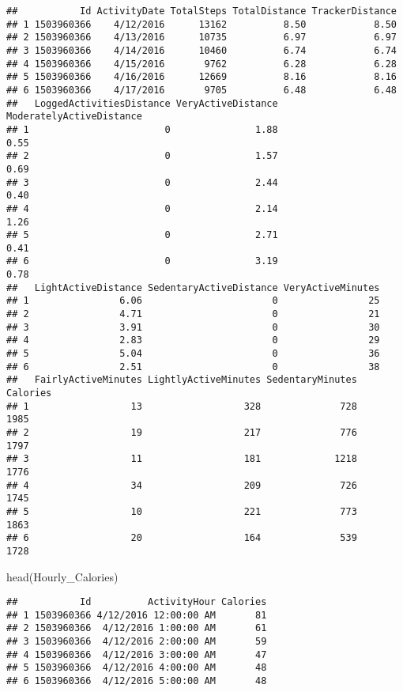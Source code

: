\documentclass[
]{article}
\newenvironment{Shaded}{\begin{snugshade}}{\end{snugshade}}
\newcommand{\FunctionTok}[1]{\textcolor[rgb]{0.00,0.00,0.00}{#1}}
\newcommand{\NormalTok}[1]{#1}
\begin{document}
\begin{verbatim}
##           Id ActivityDate TotalSteps TotalDistance TrackerDistance
## 1 1503960366    4/12/2016      13162          8.50            8.50
## 2 1503960366    4/13/2016      10735          6.97            6.97
## 3 1503960366    4/14/2016      10460          6.74            6.74
## 4 1503960366    4/15/2016       9762          6.28            6.28
## 5 1503960366    4/16/2016      12669          8.16            8.16
## 6 1503960366    4/17/2016       9705          6.48            6.48
##   LoggedActivitiesDistance VeryActiveDistance ModeratelyActiveDistance
## 1                        0               1.88                     0.55
## 2                        0               1.57                     0.69
## 3                        0               2.44                     0.40
## 4                        0               2.14                     1.26
## 5                        0               2.71                     0.41
## 6                        0               3.19                     0.78
##   LightActiveDistance SedentaryActiveDistance VeryActiveMinutes
## 1                6.06                       0                25
## 2                4.71                       0                21
## 3                3.91                       0                30
## 4                2.83                       0                29
## 5                5.04                       0                36
## 6                2.51                       0                38
##   FairlyActiveMinutes LightlyActiveMinutes SedentaryMinutes Calories
## 1                  13                  328              728     1985
## 2                  19                  217              776     1797
## 3                  11                  181             1218     1776
## 4                  34                  209              726     1745
## 5                  10                  221              773     1863
## 6                  20                  164              539     1728
\end{verbatim}

\begin{Shaded}
\begin{Highlighting}[]
\FunctionTok{head}\NormalTok{(Hourly\_Calories)}
\end{Highlighting}
\end{Shaded}

\begin{verbatim}
##           Id          ActivityHour Calories
## 1 1503960366 4/12/2016 12:00:00 AM       81
## 2 1503960366  4/12/2016 1:00:00 AM       61
## 3 1503960366  4/12/2016 2:00:00 AM       59
## 4 1503960366  4/12/2016 3:00:00 AM       47
## 5 1503960366  4/12/2016 4:00:00 AM       48
## 6 1503960366  4/12/2016 5:00:00 AM       48
\end{verbatim}
\end{document}

